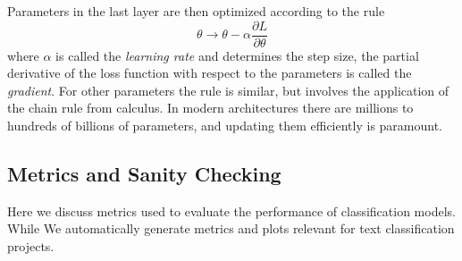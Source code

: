 Parameters in the last layer are then optimized according to the rule
\begin{equation}
    \theta \rightarrow \theta - \alpha \frac{\partial L}{\partial \theta}
\end{equation}
where $\alpha$ is called the \textit{learning rate} and determines the step size, the partial derivative of the loss function with respect to the parameters is called the \textit{gradient}.
For other parameters the rule is similar, but involves the application of the chain rule from calculus.
In modern architectures there are millions to hundreds of billions of parameters, and updating them efficiently is paramount.

\subsection{Metrics and Sanity Checking}
\label{metrics_and_sanity_checking}
Here we discuss metrics used to evaluate the performance of classification models.
While
We automatically generate metrics and plots relevant for text classification projects.

